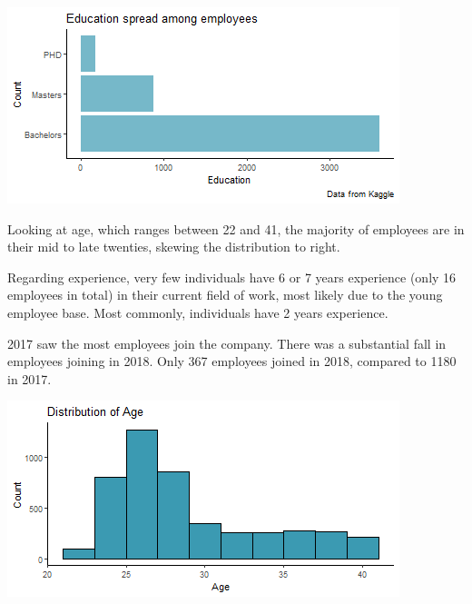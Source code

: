 \documentclass[11pt,preprint, authoryear]{elsarticle}
\let\origfigure\figure
\let\endorigfigure\endfigure
\renewenvironment{figure}[1][2] {
    \expandafter\origfigure\expandafter[H]
} {
    \endorigfigure
}
\numberwithin{equation}{section}
\numberwithin{figure}{section}
\numberwithin{table}{section}
\begin{document}
\begin{figure}[H]

{\centering \includegraphics{Final_project_files/figure-latex/Figure2-1} 

}

\caption{Education Spread \label{Figure2}}\label{fig:Figure2}
\end{figure}

Looking at age, which ranges between 22 and 41, the majority of
employees are in their mid to late twenties, skewing the distribution to
right.

Regarding experience, very few individuals have 6 or 7 years experience
(only 16 employees in total) in their current field of work, most likely
due to the young employee base. Most commonly, individuals have 2 years
experience.

2017 saw the most employees join the company. There was a substantial
fall in employees joining in 2018. Only 367 employees joined in 2018,
compared to 1180 in 2017.

\begin{figure}[H]

{\centering \includegraphics{Final_project_files/figure-latex/Figure3-1} 

}

\caption{Age Distribution \label{Figure3}}\label{fig:Figure3}
\end{figure}
\end{document}
